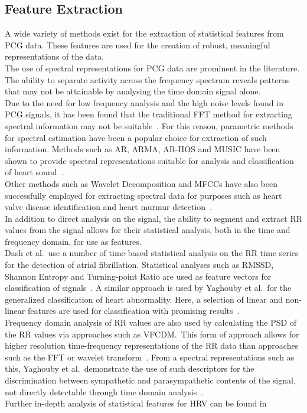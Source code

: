 \documentclass[titlepage, 12pt]{scrartcl} \usepackage{enumitem}
\begin{document}
\doublespacing
\subsection{Feature Extraction}
A wide variety of methods exist for the extraction of statistical
features from PCG data. These features are used for the creation of
robust, meaningful representations of the data.\\
The use of spectral representations for PCG data are prominent in the
literature. The ability to separate activity across the frequency
spectrum reveals patterns that may not be attainable by analysing the
time domain signal alone.\\
Due to the need for low frequency analysis and the high noise levels
found in PCG signals, it has been found that the traditional FFT
method for extracting spectral information may not be
suitable~\parencite{Akay1990}. For this reason, parametric methods for
spectral estimation have been a popular choice for extraction of such information.
Methods such as AR, ARMA, AR-HOS and MUSIC have been shown to provide spectral
representations suitable for analysis and classification of heart
sound~\parencite{Ergen2001, Schmidt2015}.\\
Other methods such as Wavelet Decomposition and MFCCs have also been
successfully  employed for extracting spectral data for purposes such
as heart valve disease identification and heart murmur
detection~\parencite{Quiceno-Manrique2010a, Maglogiannis2009}.\\

In addition to direct analysis on the signal, the ability to segment
and extract RR values from the signal allows for their statistical
analysis, both in the time and frequency domain, for use as features.\\
Dash et al.\ use a number of time-based statistical analysis on the RR
time series for the detection of atrial fibrillation. Statistical
analyses such as RMSSD, Shannon Entropy and Turning-point Ratio are
used as feature vectors for classification of
signals~\citeyearpar{Dash2009}.  A similar approach is used by Yaghouby
et al.\ for the generalized classification of heart abnormality. Here,
a selection of linear and non-linear features are used for
classification with promising results~\citeyearpar{Yaghouby2009}.\\
Frequency domain analysis of RR values are also used by calculating the
PSD of the RR values via  approaches such as VFCDM.\ This form of
approach allows for higher resolution time-frequency representations of
the RR data than approaches such as the FFT or wavelet transform~\parencite{Wang2006}.
From a spectral representations such as this, Yaghouby et al.\
demonstrate the use of such descriptors for the discrimination between
sympathetic and parasympathetic contents of the signal, not directly
detectable through time domain analysis~\citeyearpar{Yaghouby2009}.\\
Further in-depth analysis of statistical features for HRV can be found
in~\parencite{Electrophysiology1996}
\end{document}
